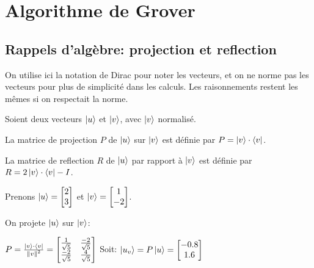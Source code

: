 \chapter{Algorithme de Grover}

\section{Rappels d'algèbre: projection et reflection}
On utilise ici la notation de Dirac pour noter les vecteurs, et on ne norme pas les vecteurs pour plus de simplicité dans les calculs. Les raisonnements restent les mêmes si on respectait la norme.

Soient deux vecteurs $\ket{u}$ et $\ket{v}$, avec $\ket{v}$ normalisé.

\begin{definition}
  La matrice de projection $P$ de $\ket{u}$ sur $\ket{v}$ est définie par $P = \ket{v} \cdot \bra{v}$.
\end{definition}

\begin{definition}
  La matrice de reflection $R$ de $\ket{u}$ par rapport à $\ket{v}$ est définie par $R = 2 \ket{v} \cdot \bra{v} - I$.
\end{definition}

\begin{ex}
Prenons $\ket{u}=\begin{bmatrix}2\\3\end{bmatrix}$ et $\ket{v}=\begin{bmatrix}1\\-2\end{bmatrix}$.

On projete $\ket{u}$ sur $\ket{v}$:

$P = \frac{\ket{v} \cdot \bra{v}}{\left\lVert v\right\rVert^2} = \begin{bmatrix}\frac{1}{\sqrt{5}} & \frac{-2}{\sqrt{5}}\\\frac{-2}{\sqrt{5}} & \frac{4}{\sqrt{5}}\end{bmatrix}$
\medbreak
Soit: $\ket{u_v} = P\ket{u} = \begin{bmatrix}-0.8\\1.6\end{bmatrix}$
\end{ex}

